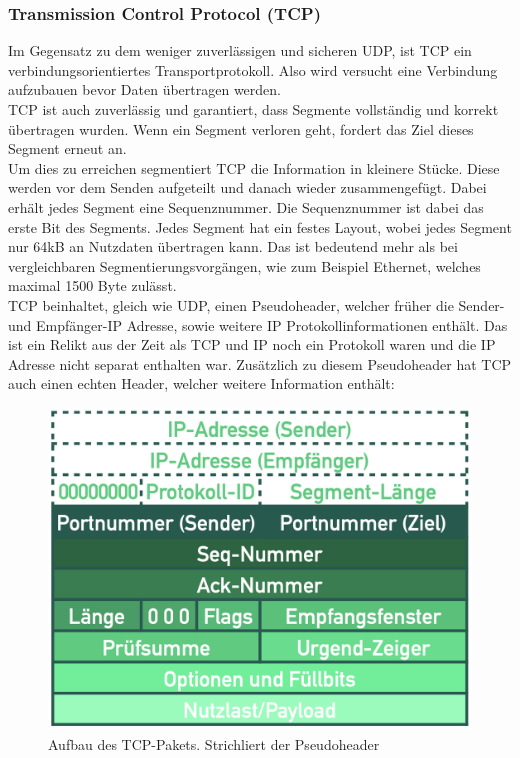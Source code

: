 \documentclass{article}
\begin{document}
	 \subsubsection{Transmission Control Protocol (TCP)}
	 Im Gegensatz zu dem weniger zuverlässigen und sicheren UDP, ist TCP ein verbindungsorientiertes Transportprotokoll. Also wird versucht eine Verbindung aufzubauen bevor Daten übertragen werden.\\
	 TCP ist auch zuverlässig und garantiert, dass Segmente vollständig und korrekt übertragen wurden. Wenn ein Segment verloren geht, fordert das Ziel dieses Segment erneut an. \\
	 Um dies zu erreichen segmentiert TCP die Information in kleinere Stücke. Diese werden vor dem Senden aufgeteilt und danach wieder zusammengefügt. Dabei erhält jedes Segment eine Sequenznummer. Die Sequenznummer ist dabei das erste Bit des Segments.
	 Jedes Segment hat ein festes Layout, wobei jedes Segment nur 64kB an Nutzdaten übertragen kann. Das ist bedeutend mehr als bei vergleichbaren Segmentierungsvorgängen, wie zum Beispiel Ethernet, welches maximal 1500 Byte zulässt. \\
	 TCP beinhaltet, gleich wie UDP, einen Pseudoheader, welcher früher die Sender- und Empfänger-IP Adresse, sowie weitere IP Protokollinformationen enthält. Das ist ein Relikt aus der Zeit als TCP und IP noch ein Protokoll waren und die IP Adresse nicht separat enthalten war.
	 Zusätzlich zu diesem Pseudoheader hat TCP auch einen echten Header, welcher weitere Information enthält:
	 \begin{figure}[H]
	 \centering
	 \includegraphics[scale=0.4]{Bilder/TCP.png}
	 \caption{Aufbau des TCP-Pakets. Strichliert der Pseudoheader}
	 \end{figure}
	 
\end{document}
